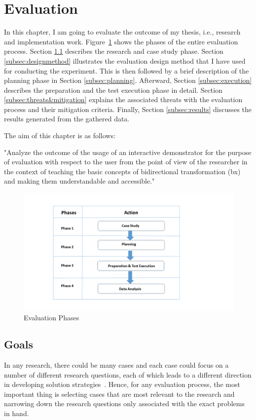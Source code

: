 \section{Evaluation}\label{sec:evaluation} 
In this chapter, I am going to evaluate the outcome of my thesis, i.e., research and implementation work. 
Figure~\ref{fig:Evaluation_Phases} shows the phases of the entire evaluation process. Section \ref{subsec:goals} describes the research and case study phase. Section \ref{subsec:designmethod} illustrates the evaluation design method that I have used for conducting the experiment. This is then followed by a brief description of the planning phase in Section \ref{subsec:planning}. Afterward, Section \ref{subsec:execution} describes the preparation and the test execution phase in detail. Section \ref{subsec:threats&mitigation} explains the associated threats with the evaluation process and their mitigation criteria. Finally, Section \ref{subsec:results} discusses the results generated from the gathered data. 

The aim of this chapter is as follows: 

"Analyze the outcome of the usage of an interactive demonstrator for the purpose of evaluation with respect to the user from the point of view of the researcher in the context of teaching the basic concepts of bidirectional transformation (bx) and making them understandable and accessible."

\begin{figure}[h]
	\includegraphics[width=1\textwidth]{figures/Evaluation_Phases}
	\caption{Evaluation Phases}
	\label{fig:Evaluation_Phases}
\end{figure}

\subsection{Goals}\label{subsec:goals}  
In any research, there could be many cases and each case could focus on a number of different research questions, each of which leads to a different direction in developing solution strategies~\cite{semethods}. Hence, for any evaluation process, the most important thing is selecting cases that are most relevant to the research and narrowing down the research questions only associated with the exact problems in hand. 

